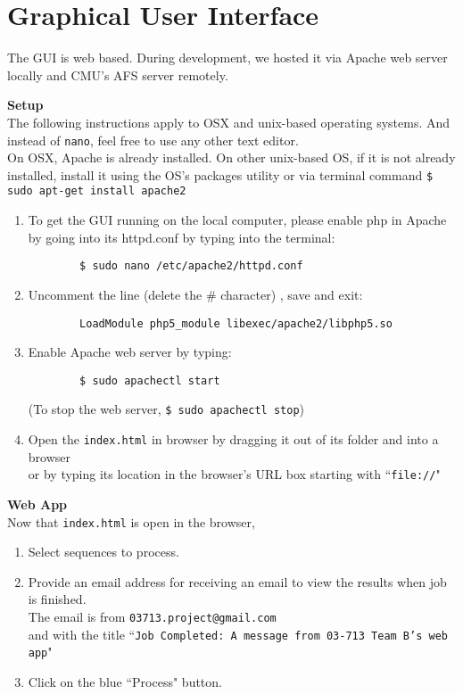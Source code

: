 \documentclass[11pt]{article}
\begin{document}
\section{Graphical User Interface}
The GUI is web based. During development, we hosted it via Apache web server locally and CMU's AFS server remotely.
\bigskip

\textbf{Setup}\\
The following instructions apply to OSX and unix-based operating systems. And instead of \texttt{nano}, feel free to use any other text editor.\\
On OSX, Apache is already installed. On other unix-based OS, if it is not already installed, install it using the OS's packages utility or via terminal command \texttt{\$ sudo apt-get install apache2}\\
\begin{enumerate}
    \item To get the GUI running on the local computer, please enable php in Apache by going into its httpd.conf by typing into the terminal:
		\begin{verbatim}
		$ sudo nano /etc/apache2/httpd.conf
		\end{verbatim}
	\item Uncomment the line (delete the \# character) , save and exit:
		\begin{verbatim}
		LoadModule php5_module libexec/apache2/libphp5.so
		\end{verbatim}
	\item Enable Apache web server by typing:
		\begin{verbatim}
		$ sudo apachectl start
		\end{verbatim}
	(To stop the web server, \texttt{\$ sudo apachectl stop})
	\item Open the \texttt{index.html} in browser by dragging it out of its folder and into a browser
	\\or by typing its location in the browser's URL box starting with ``\texttt{file://}"
\end{enumerate}
\bigskip

\textbf{Web App}\\
Now that \texttt{index.html} is open in the browser,
\begin{enumerate}
	\item Select sequences to process.
	\item Provide an email address for receiving an email to view the results when job is finished.\\
		The email is from \texttt{03713.project@gmail.com}\\
		and with the title ``\texttt{Job Completed: A message from 03-713 Team B's web app}"
	\item Click on the blue ``Process" button.
\end{enumerate}
\bigskip
\end{document}
